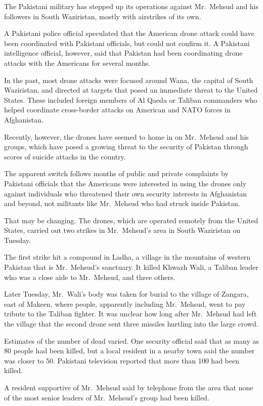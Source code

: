 ﻿\documentclass[12pt]{article}
\begin{document}
The Pakistani military has stepped up its operations against Mr.~Mehsud and his followers in South
Waziristan, mostly with airstrikes of its own.

A Pakistani police official speculated that the American drone attack could have been coordinated
with Pakistani officials, but could not confirm it. A Pakistani intelligence official, however, said
that Pakistan had been coordinating drone attacks with the Americans for several months.

In the past, most drone attacks were focused around Wana, the capital of South Waziristan, and
directed at targets that posed an immediate threat to the United States. These included foreign
members of Al Qaeda or Taliban commanders who helped coordinate cross-border attacks on American and
NATO forces in Afghanistan.

Recently, however, the drones have seemed to home in on Mr.~Mehsud and his groups, which have posed
a growing threat to the security of Pakistan through scores of suicide attacks in the country.

The apparent switch follows months of public and private complaints by Pakistani officials that the
Americans were interested in using the drones only against individuals who threatened their own
security interests in Afghanistan and beyond, not militants like Mr.~Mehsud who had struck inside
Pakistan.

That may be changing. The drones, which are operated remotely from the United States, carried out
two strikes in Mr.~Mehsud's area in South Waziristan on Tuesday.

The first strike hit a compound in Ladha, a village in the mountains of western Pakistan that is
Mr.~Mehsud's sanctuary. It killed Khwazh Wali, a Taliban leader who was a close aide to Mr.~Mehsud,
and three others.

Later Tuesday, Mr.~Wali's body was taken for burial to the village of Zangara, east of Makeen, where
people, apparently including Mr.~Mehsud, went to pay tribute to the Taliban fighter. It was unclear
how long after Mr.~Mehsud had left the village that the second drone sent three missiles hurtling
into the large crowd.

Estimates of the number of dead varied. One security official said that as many as 80 people had
been killed, but a local resident in a nearby town said the number was closer to 50. Pakistani
television reported that more than 100 had been killed.

A resident supportive of Mr.~Mehsud said by telephone from the area that none of the most senior
leaders of Mr.~Mehsud's group had been killed.
\end{document}
